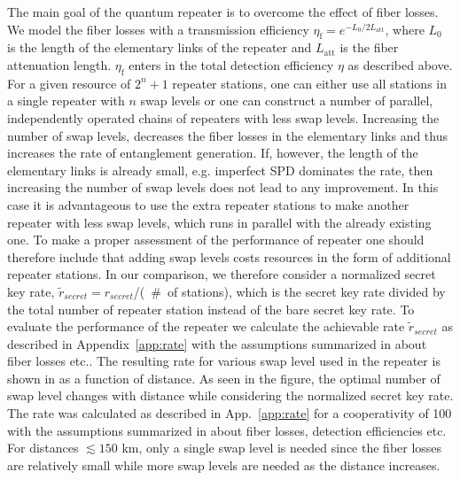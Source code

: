 The main goal of the quantum repeater is to overcome the effect of fiber losses.
We model the fiber losses with a transmission efficiency
$\eta_{\mathrm{f}}=e^{-L_{0}/2L_\mathrm{att}}$, where $L_{0}$ is the length of
the elementary links of the repeater and $L_\mathrm{att}$ is the fiber attenuation
length.
$\eta_{\mathrm{f}}$ enters in the total detection efficiency $\eta$ as described
above. For a given resource of $2^{n}+1$ repeater stations, one can either use
all stations in a single repeater with $n$ swap levels or one can construct a
number of parallel, independently operated chains of repeaters with less swap
levels. Increasing the number of swap levels, decreases the fiber losses in the
elementary links and thus increases the rate of entanglement generation. If,
however, the length of the elementary links is already small,  e.g.
imperfect SPD dominates the rate, then increasing the number of swap levels does
not lead to any improvement. In this case it is advantageous to use the extra
repeater stations to make another repeater with less swap levels, which runs in
parallel with the already existing one. To make a proper assessment of the
performance of repeater one should therefore include that adding swap levels
costs resources in the form of additional repeater stations. In our comparison,
we therefore consider a normalized secret key rate,
$\tilde{r}_{secret}=r_{secret}$/(~\#~of stations), which is the secret key rate
divided by the total number of repeater station instead of the bare secret key
rate. To evaluate the performance of the repeater we calculate the achievable
rate $\tilde r_{secret}$ as described in Appendix~\ref{app:rate} with the
assumptions summarized in  about fiber losses etc.. The
resulting rate for various swap level used in the repeater is shown in
 as a function of distance. As seen in the figure, the
optimal number of swap level changes with distance while considering the
normalized secret key rate. The rate was calculated as described in
App.~\ref{app:rate} for a cooperativity of 100 with the assumptions summarized
in  about fiber losses, detection efficiencies etc. For
distances $\lesssim 150$ km, only a single swap level is needed since the fiber
losses are relatively small while more swap levels are needed as the distance
increases.

